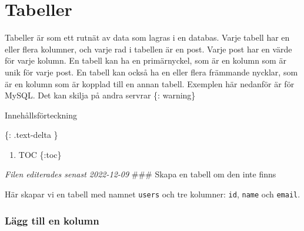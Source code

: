 \hypertarget{tabeller}{%
\section{Tabeller}\label{tabeller}}

Tabeller är som ett rutnät av data som lagras i en databas. Varje tabell
har en eller flera kolumner, och varje rad i tabellen är en post. Varje
post har en värde för varje kolumn. En tabell kan ha en primärnyckel,
som är en kolumn som är unik för varje post. En tabell kan också ha en
eller flera främmande nycklar, som är en kolumn som är kopplad till en
annan tabell. Exemplen här nedanför är för MySQL. Det kan skilja på
andra servrar \{: warning\}

Innehållsförteckning

\{: .text-delta \}

\begin{enumerate}
\def\labelenumi{\arabic{enumi}.}
\tightlist
\item
  TOC \{:toc\}
\end{enumerate}

\emph{Filen editerades senast 2022-12-09} \#\#\# Skapa en tabell om den
inte finns

Här skapar vi en tabell med namnet \texttt{users} och tre kolumner:
\texttt{id}, \texttt{name} och \texttt{email}.

\hypertarget{cb1}{}
\begin{Shaded}
\begin{Highlighting}[]
    
 \NormalTok{(} \NormalTok{,}
\NormalTok{(}\NormalTok{) } \NormalTok{,}
\NormalTok{(}\NormalTok{)}
\NormalTok{);}
\end{Highlighting}
\end{Shaded}

\hypertarget{luxe4gg-till-en-kolumn}{%
\subsubsection{Lägg till en kolumn}\label{luxe4gg-till-en-kolumn}}

\hypertarget{cb2}{}
\begin{Shaded}
\begin{Highlighting}[]
  \NormalTok{(}\NormalTok{);}
\end{Highlighting}
\end{Shaded}

